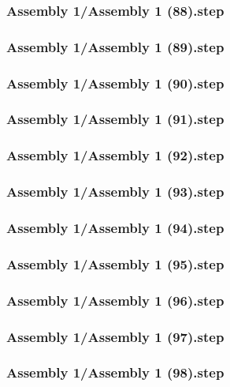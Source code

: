 \documentclass[a4paper,12pt]{article}
\begin{document}
\begin{lstlising}[language=C++]
\subsubsection{Assembly 1/Assembly 1 (88).step}

\subsubsection{Assembly 1/Assembly 1 (89).step}

\subsubsection{Assembly 1/Assembly 1 (90).step}

\subsubsection{Assembly 1/Assembly 1 (91).step}

\subsubsection{Assembly 1/Assembly 1 (92).step}

\subsubsection{Assembly 1/Assembly 1 (93).step}

\subsubsection{Assembly 1/Assembly 1 (94).step}

\subsubsection{Assembly 1/Assembly 1 (95).step}

\subsubsection{Assembly 1/Assembly 1 (96).step}

\subsubsection{Assembly 1/Assembly 1 (97).step}

\subsubsection{Assembly 1/Assembly 1 (98).step}


\end{lstlising}
\end{document}
